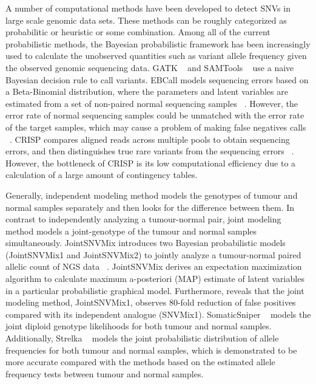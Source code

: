 \documentclass[11pt,reqno]{amsart}
\begin{document}
A number of computational methods have been developed to detect SNVs in large scale genomic data sets.
These methods can be roughly categorized as probabilitic or heuristic or some combination.
Among all of the current probabilistic methods, the Bayesian probabilistic framework has been increasingly used to calculate the unobserved quantities such as variant allele frequency given the observed genomic sequencing data.
GATK ~\citep{mckenna2010genome} and SAMTools ~\citep{li2009sequence} use a naive Bayesian decision rule to call variants.
EBCall models sequencing errors based on a Beta-Binomial distribution, where the parameters and latent variables are estimated from a set of non-paired normal sequencing samples ~\citep{shiraishi2013empirical}.
However, the error rate of normal sequencing samples could be unmatched with the error rate of the target samples, which may cause a problem of making false negatives calls ~\citep{wang2013detecting}.
CRISP compares aligned reads across multiple pools to obtain sequencing errors, and then distinguishes true rare variants from the sequencing errors ~\citep{bansal2010statistical}.
However, the bottleneck of CRISP is its low computational efficiency due to a calculation of a large amount of contingency tables.

Generally, independent modeling method models the genotypes of tumour and normal samples separately and then looks for the difference between them.
In contrast to independently analyzing a tumour-normal pair, joint modeling method models a joint-genotype of the tumour and normal samples simultaneously.
JointSNVMix introduces two Bayesian probabilistic models (JointSNVMix1 and JointSNVMix2) to jointly analyze a tumour-normal paired allelic count of NGS data ~\citep{roth2012jointsnvmix}.
JointSNVMix derives an expectation maximization algorithm to calculate maximum a-posteriori (MAP) estimate of latent variables in a particular probabilistic graphical model.
Furthermore, \citet{roth2012jointsnvmix} reveals that the joint modeling method, JointSNVMix1, observes 80-fold reduction of false positives compared with its independent analogue (SNVMix1).
SomaticSniper ~\citep{larson2012somaticsniper} models the joint diploid genotype likelihoods for both tumour and normal samples.
Additionally, Strelka ~\citep{saunders2012strelka} models the joint probabilistic distribution of allele frequencies for both tumour and normal samples, which is demonstrated to be more accurate compared with the methods based on the estimated allele frequency tests between tumour and normal samples.
\end{document}
